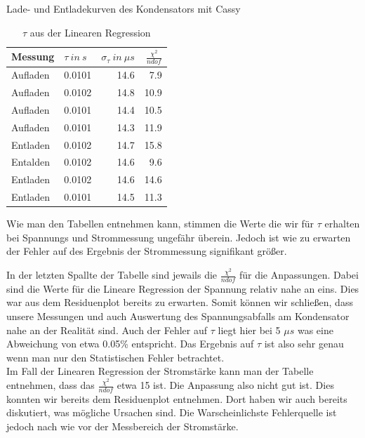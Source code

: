 \documentclass[twoside]{protokoll}
\begin{document}
\begin{aufgabe}{Lade- und Entladekurven des Kondensators mit Cassy}
\begin{table}[H]
        \centering
        \begin{tabularx}{1\textwidth}{X X r r} %
            \toprule
            \textbf{Messung} & \textbf{$\tau \ in \ s$} & \textbf{$\sigma_{\tau} \ in \ \mu s$} & $\frac{\chi^2}{ndof}$ \\
            \midrule
             
            Aufladen & 0.0101 & 14.6 & 7.9 \\
            Aufladen & 0.0102 & 14.8 & 10.9 \\
            Aufladen & 0.0101 & 14.4 & 10.5 \\
            Aufladen & 0.0101 & 14.3 & 11.9 \\
            Entladen & 0.0102 & 14.7 & 15.8 \\
            Entalden & 0.0102 & 14.6 & 9.6 \\
            Entladen & 0.0102 & 14.6 & 14.6 \\
            Entladen & 0.0101 & 14.5 & 11.3 \\
             
            \bottomrule
        \end{tabularx}
        \caption{$\tau$ aus der Linearen Regression}
        \label{tab:mytable}
    \end{table}
    

Wie man den Tabellen entnehmen kann, stimmen die Werte die wir für $\tau$ erhalten bei Spannungs und Strommessung ungefähr überein.
Jedoch ist wie zu erwarten der Fehler auf des Ergebnis der Strommessung signifikant größer. 

In der letzten Spallte der Tabelle sind jewails die $\frac{\chi^2}{ndof}$ für die Anpassungen. Dabei sind die Werte für die Lineare Regression der Spannung relativ nahe an eins.
Dies war aus dem Residuenplot bereits zu erwarten. Somit können wir schließen, dass unsere Messungen und auch Auswertung des Spannungsabfalls am Kondensator nahe an der Realität sind. 
Auch der Fehler auf $\tau$ liegt hier bei 5 $\mu s$ was eine Abweichung von etwa 0.05\% entspricht.  
Das Ergebnis auf $\tau$ ist also sehr genau wenn man nur den Statistischen Fehler betrachtet.\\

Im Fall der Linearen Regression der Stromstärke kann man der Tabelle entnehmen, dass das $\frac{\chi^2}{ndof}$ etwa 15 ist.
Die Anpassung also nicht gut ist. Dies konnten wir bereits dem Residuenplot entnehmen.
Dort haben wir auch bereits diskutiert, was mögliche Ursachen sind. 
Die Warscheinlichste Fehlerquelle ist jedoch nach wie vor der Messbereich der Stromstärke.\\


\end{aufgabe}
\end{document}
